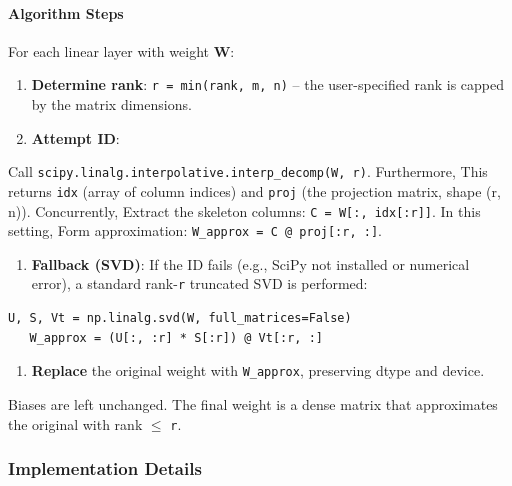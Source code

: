 \paragraph{Algorithm Steps}

For each linear layer with weight \textbf{W}:

\begin{enumerate}
\item \textbf{Determine rank}: \texttt{r = min(rank, m, n)} -- the user-specified rank is capped by the matrix dimensions.
\item \textbf{Attempt ID}:
\end{enumerate}
Call \texttt{scipy.linalg.interpolative.interp\_decomp(W, r)}. Furthermore, This returns \texttt{idx} (array of column indices) and \texttt{proj} (the projection matrix, shape (r, n)). Concurrently, Extract the skeleton columns: \texttt{C = W[:, idx[:r]]}. In this setting, Form approximation: \texttt{W\_approx = C @ proj[:r, :]}.

\begin{enumerate}
\item \textbf{Fallback (SVD)}: If the ID fails (e.g., SciPy not installed or numerical error), a standard rank-\texttt{r} truncated SVD is performed:
\end{enumerate}
\vspace{0.5em}
\begin{mdframed}[backgroundcolor=codebg, linecolor=codeframe, linewidth=1pt, roundcorner=4pt, innerleftmargin=2pt, innerrightmargin=5pt, innertopmargin=5pt, innerbottommargin=5pt]
\begin{lstlisting}
U, S, Vt = np.linalg.svd(W, full_matrices=False)
   W_approx = (U[:, :r] * S[:r]) @ Vt[:r, :]
\end{lstlisting}
\end{mdframed}
\vspace{0.5em}
\begin{enumerate}
\item \textbf{Replace} the original weight with \texttt{W\_approx}, preserving dtype and device.

\end{enumerate}
Biases are left unchanged. The final weight is a dense matrix that approximates the original with rank $\le$ \texttt{r}.


\subsubsection*{Implementation Details}

